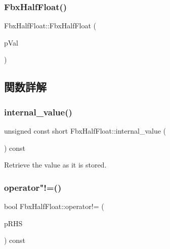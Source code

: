 \mbox{\label{class_fbx_half_float_ae8971c684f7e3c98be4906947dc5e01f}} 
\subsubsection{\texorpdfstring{Fbx\+Half\+Float()}{FbxHalfFloat()}\hspace{0.1cm}{\footnotesize\ttfamily [3/3]}}
{\footnotesize\ttfamily Fbx\+Half\+Float\+::\+Fbx\+Half\+Float (\begin{DoxyParamCaption}\item[{const \hyperlink{class_fbx_half_float}{Fbx\+Half\+Float} \&}]{p\+Val }\end{DoxyParamCaption})}



\subsection{関数詳解}
\mbox{\label{class_fbx_half_float_afca669380f113fca23f5a7e532cf3b57}} 
\subsubsection{\texorpdfstring{internal\+\_\+value()}{internal\_value()}}
{\footnotesize\ttfamily unsigned const short Fbx\+Half\+Float\+::internal\+\_\+value (\begin{DoxyParamCaption}{ }\end{DoxyParamCaption}) const}

Retrieve the value as it is stored. \mbox{\label{class_fbx_half_float_a4ec7516fcc8a5d1c3f446c93a1ffea41}} 
\subsubsection{\texorpdfstring{operator"!=()}{operator!=()}}
{\footnotesize\ttfamily bool Fbx\+Half\+Float\+::operator!= (\begin{DoxyParamCaption}\item[{const \hyperlink{class_fbx_half_float}{Fbx\+Half\+Float} \&}]{p\+R\+HS }\end{DoxyParamCaption}) const}

